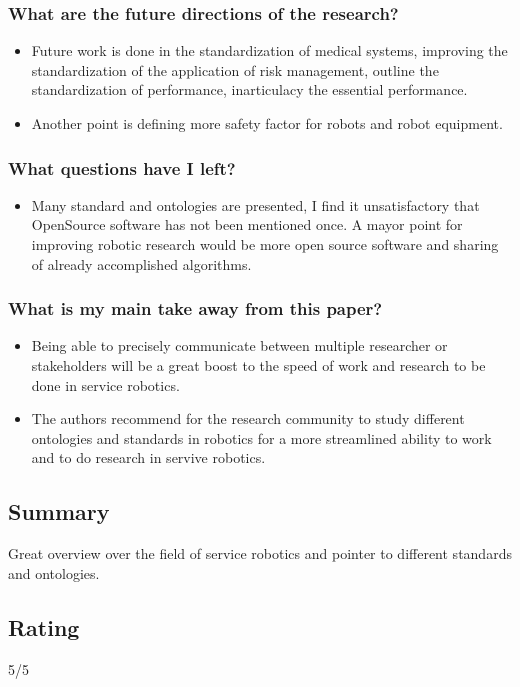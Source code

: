 \subsubsection*{What are the future directions of the research?}
\begin{itemize}
    \item Future work is done in the standardization of medical systems, improving the standardization of the application of risk management, outline the standardization of performance, inarticulacy the essential performance.
    \item Another point is defining more safety factor for robots and robot equipment.
\end{itemize}
\subsubsection*{What questions have I left?}
\begin{itemize}
    \item Many standard and ontologies are presented, I find it unsatisfactory that OpenSource software has not been mentioned once. A mayor point for improving robotic research would be more open source software and sharing of already accomplished algorithms.
\end{itemize}
\subsubsection*{What is my main take away from this paper?}
\begin{itemize}
    \item Being able to precisely communicate between multiple researcher or stakeholders will be a great boost to the speed of work and research to be done in service robotics.
    \item The authors recommend for the research community to study different ontologies and standards in robotics for a more streamlined ability to work and to do research in servive robotics.
\end{itemize}

\subsection*{Summary}
Great overview over the field of service robotics and pointer to different standards and ontologies.

\subsection*{Rating}
5/5

